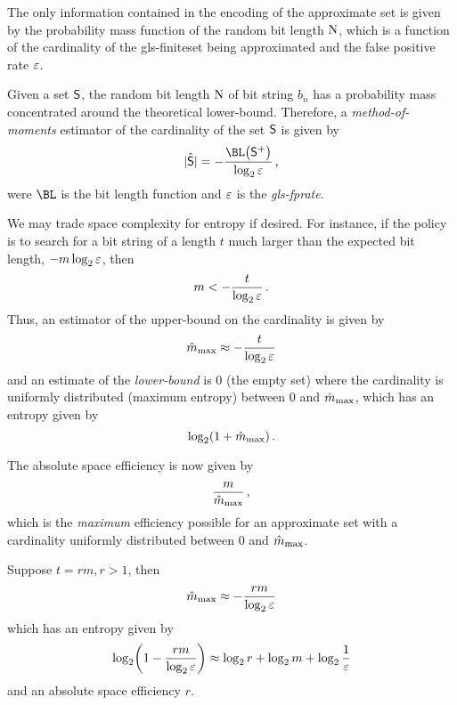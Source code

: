 \documentclass[ ../main.tex]{subfiles}
\begin{document}
The only information contained in the encoding of the approximate set is given by the probability mass function of the random bit length $\mathrm{N}$, which is a function of the cardinality of the \gls{gls-finiteset} being approximated and the false positive rate $\varepsilon$.

Given a set $\Set{S}$, the random bit length $\mathrm{N}$ of bit string $b_n$ has a probability mass concentrated around the theoretical lower-bound. Therefore, a \emph{method-of-moments} estimator of the cardinality of the set $\Set{S}$ is given by
\begin{equation}
    \hat{\Card{\Set{S}}} = -\frac{\BL\!\left(\PASet{S}\right)}{\log_2 \fprate}\,,
\end{equation}
were $\BL$ is the bit length function and $\varepsilon$ is the \emph{\gls{gls-fprate}}.

We may trade space complexity for entropy if desired. For instance, if the policy is to search for a bit string of a length $t$ much larger than the expected bit length, $-m \log_2 \varepsilon$, then
\begin{equation}
    m < -\frac{t}{\log_2 \varepsilon}\,.
\end{equation}
Thus, an estimator of the upper-bound on the cardinality is given by
\begin{equation}
    \hat{m}_{\rm{max}} \approx -\frac{t}{\log_2 \varepsilon}
\end{equation}
and an estimate of the \emph{lower-bound} is $0$ (the empty set) where the cardinality is uniformly distributed (maximum entropy) between $0$ and $\hat{m}_{\rm{max}}$, which has an entropy given by
\begin{equation}
    \log_2(1+\hat{m}_{\rm{max}})\,.
\end{equation}

The absolute space efficiency is now given by
\begin{equation}
    \frac{m}{\hat{m}_{\rm{max}}}\,,
\end{equation}
which is the \emph{maximum} efficiency possible for an approximate set with a cardinality uniformly distributed between $0$ and $\hat{m}_{\mathrm{max}}$.

\begin{example}
Suppose $t = r m, r > 1$, then
\begin{equation}
    \hat{m}_{\rm{max}} \approx -\frac{r m}{\log_2 \varepsilon}
\end{equation}
which has an entropy given by
\begin{equation}
    \log_2\!\left(1 -\frac{r m}{\log_2 \varepsilon}\right) \approx \log_2 r + \log_2 m + \log_2 \frac{1}{\varepsilon}
\end{equation}
and an absolute space efficiency $r$.
\end{example}
\end{document}
